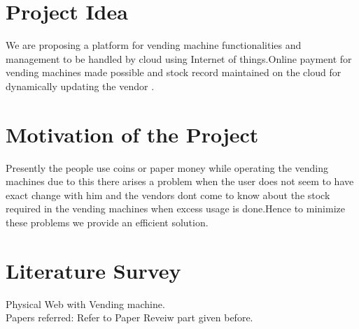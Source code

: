 \documentclass[oneside,a4paper,12pt]{report}
\begin{document}
\section{Project Idea}

 We are proposing a platform for vending machine functionalities and management to be  handled by cloud using Internet of things.Online payment for vending machines made possible and stock record maintained on the cloud for dynamically updating the vendor .


\section{Motivation of the Project}  

 Presently the people use coins or paper money while operating the vending machines due to this there arises a problem when the user does not seem to have exact change with him and the vendors dont come to know about the stock required in the vending machines when excess usage is done.Hence to minimize these problems we provide an efficient solution.

\section{Literature Survey}
 Physical Web with Vending machine.\\
Papers referred: Refer to Paper Reveiw part given before.\\
\end{document}
